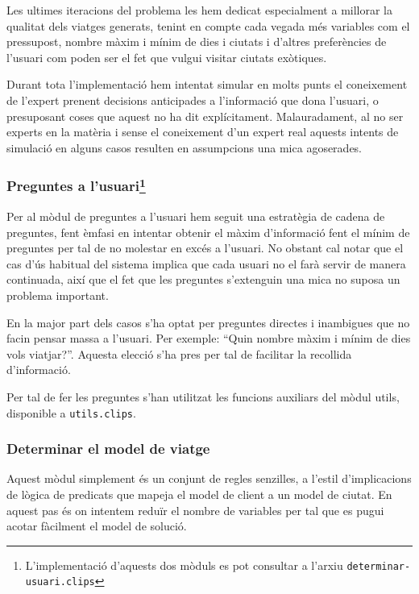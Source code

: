 \documentclass[11pt,a4paper]{article}
\begin{document}
Les ultimes iteracions del problema les hem dedicat especialment a millorar la qualitat dels viatges generats, tenint en compte cada vegada més variables com el pressupost, nombre màxim i mínim de dies i ciutats i d'altres preferències de l'usuari com poden ser el fet que vulgui visitar ciutats exòtiques.

Durant tota l'implementació hem intentat simular en molts punts el coneixement de l'expert prenent decisions anticipades a l'informació que dona l'usuari, o presuposant coses que aquest no ha dit explícitament. Malauradament, al no ser experts en la matèria i sense el coneixement d'un expert real aquests intents de simulació en alguns casos resulten en assumpcions una mica agoserades.

\subsubsection*{Preguntes a l'usuari\footnote{L'implementació d'aquests dos mòduls es pot consultar a l'arxiu \texttt{determinar-usuari.clips}}}



Per al mòdul de preguntes a l'usuari hem seguit una estratègia de cadena de preguntes, fent èmfasi en intentar obtenir el màxim d'informació fent el mínim de preguntes per tal de no molestar en excés a l'usuari. No obstant cal notar que el cas d'ús habitual del sistema implica que cada usuari no el farà servir de manera continuada, així que el fet que les preguntes s'extenguin una mica no suposa un problema important.

En la major part dels casos s'ha optat per preguntes directes i inambigues que no facin pensar massa a l'usuari. Per exemple: ``Quin nombre màxim i mínim de dies vols viatjar?''. Aquesta elecció s'ha pres per tal de facilitar la recollida d'informació.

Per tal de fer les preguntes s'han utilitzat les funcions auxiliars del mòdul utils, disponible a \texttt{utils.clips}.

\subsubsection*{Determinar el model de viatge}

Aquest mòdul simplement és un conjunt de regles senzilles, a l'estil d'implicacions de lògica de predicats que mapeja el model de client a un model de ciutat. En aquest pas és on intentem reduïr el nombre de variables per tal que es pugui acotar fàcilment el model de solució.\\
\end{document}
